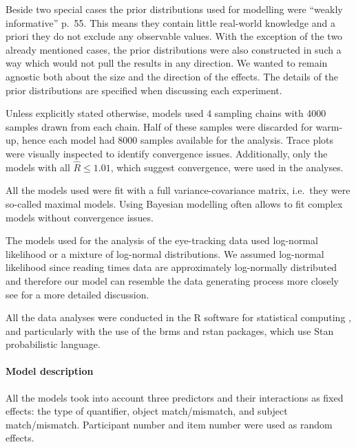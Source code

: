 \documentclass[11pt]{article} %
\begin{document}
Beside two special cases the prior distributions used for modelling were
``weakly informative'' \citep{gelman2003bda} p.~55. This means they
contain little real-world knowledge and a priori they do not exclude any
observable values. With the exception of the two already mentioned
cases, the prior distributions were also constructed in such a way which
would not pull the results in any direction. We wanted to remain
agnostic both about the size and the direction of the effects. The
details of the prior distributions are specified when discussing each
experiment.

Unless explicitly stated otherwise, models used 4 sampling chains with
4000 samples drawn from each chain. Half of these samples were discarded
for warm-up, hence each model had 8000 samples available for the
analysis. Trace plots were visually inspected to identify convergence
issues. Additionally, only the models with all \(\hat{R} \leq 1.01\),
which suggest convergence, were used in the analyses.

All the models used were fit with a full variance-covariance matrix,
i.e.~they were so-called maximal models. Using Bayesian modelling often
allows to fit complex models without convergence issues.

The models used for the analysis of the eye-tracking data used
log-normal likelihood or a mixture of log-normal distributions. We
assumed log-normal likelihood since reading times data are approximately
log-normally distributed and therefore our model can resemble the data
generating process more closely see \citep{rouder2008hierarchical,Nicenboim_2016,nicenboim2018explor_confir} for a more detailed discussion.

All the data analyses were conducted in the R software for statistical
computing \citep{Rcore}, and particularly with the use of the brms
\citep{burkner2017brms} and rstan \citep{team2020rstan} packages,
which use Stan \citep{stan2021} probabilistic language.



\paragraph{Model description}\label{model-description}

All the models took into account three predictors and their interactions
as fixed effects: the type of quantifier, object match/mismatch, and
subject match/mismatch. Participant number and item number were used as
random effects.
\end{document}
